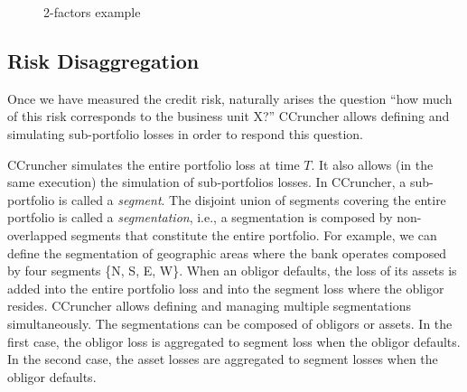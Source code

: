 \documentclass[11pt,fleqn]{book} %
\begin{document}
\begin{figure}[!h]
	\centering
	\hfill
	\caption{2-factors example}
	\label{fig:test05}
\end{figure}

\subsection{Risk Disaggregation}
\label{ss:ra}

Once we have measured the credit risk, naturally arises the question 
``how much of this risk corresponds to the business unit X?'' CCruncher
allows defining and simulating sub-portfolio losses in order to respond
this question.

CCruncher simulates the entire portfolio loss at time $T$. It also allows 
(in the same execution) the simulation of sub-portfolios losses. In CCruncher, 
a sub-portfolio is called a \emph{segment}. The disjoint union of segments 
covering the entire portfolio is called a \emph{segmentation}, i.e., a 
segmentation is composed by non-overlapped segments that constitute the 
entire portfolio. For example, we can define the segmentation of geographic
areas where the bank operates composed by four segments \{N, S, E, W\}.
When an obligor defaults, the loss of its assets is added into the 
entire portfolio loss and into the segment loss where the obligor resides.
CCruncher allows defining and managing multiple segmentations simultaneously. 
The segmentations can be composed of obligors or assets. In the first case, 
the obligor loss is aggregated to segment loss when the obligor defaults. 
In the second case, the asset losses are aggregated to segment losses when 
the obligor defaults.
\end{document}
